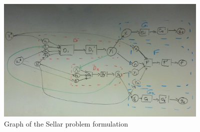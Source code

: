 \begin{figure}[htb!]
    \begin{center}
    \includegraphics[width=4in]{images/sellar_graph_full}
    \end{center}
    \vspace{-10pt}
\caption{Graph of the Sellar problem formulation}
\label{f:sellar_graph_full}
\end{figure}

